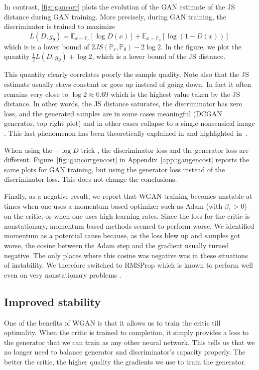 \documentclass{article} %
\newcommand\EE{\mathbb{E}}
\newcommand\PP{\mathbb{P}}
\theoremstyle{definition}
\theoremstyle{definition}
\begin{document}
In contrast, \autoref{fig::gancorr} plots the evolution of the GAN estimate
of the JS distance during GAN training. More precisely, during GAN training,
the discriminator is trained to maximize
 $$L(D, g_\theta) = \EE_{x \sim \PP_r}[\log D(x)] + \EE_{x \sim \PP_\theta}[\log(1 - D(x))]$$
which is is a lower bound of $2 JS(\PP_r,\PP_\theta) - 2 \log 2$.
In the figure, we plot the quantity $\frac{1}{2} L(D, g_\theta) + \log 2$,
which is a lower bound of the JS distance.

This quantity clearly correlates poorly the sample quality. Note
also that the JS estimate usually stays constant or goes up instead
of going down. In fact
it often remains very close to $\log2\approx0.69$ which is the highest
value taken by the JS distance. In other words, the JS distance
saturates, the discriminator has zero loss, and the generated samples
are in some cases meaningful (DCGAN generator, top right plot) and in
other cases collapse to a single nonsensical image \cite{Good-ea-GAN}.
This last phenomenon has been theoretically explained in
\cite{Arj-ea-Princ} and highlighted in~\cite{Metz-ea-UG}.

When using the $-\log D$ trick \cite{Good-ea-GAN},
the discriminator loss and the generator loss are different.
Figure~\ref{fig::gancorrgencost} in Appendix~\ref{app::gangencost}
reports the same plots for GAN training, but using
the generator loss instead of the discriminator loss.
This does not change the conclusions.

Finally, as a negative result, we report that WGAN training becomes unstable
at times when one uses a momentum based optimizer such as Adam \cite{Kingma-ea-Adam} (with $\beta_1 > 0$)
on the critic, or
when one uses high learning rates. Since the loss for the critic is nonstationary, momentum
based methods seemed to perform worse. We identified
momentum as a potential cause because, as the loss blew up and samples got worse,
the cosine between the Adam step and the gradient usually turned negative. The
only places where this cosine was negative was in these situations of
instability. We therefore switched to RMSProp \cite{Tieleman2012} which is known
to perform well even on very nonstationary problems \cite{Mnih-ea-A3C}.

\subsection{Improved stability}

One of the benefits of WGAN is that it allows us to train the critic
till optimality. When the critic is trained to completion, it simply
provides a loss to the generator that we can train as any other neural
network. This tells us that we no longer need to balance generator and
discriminator's capacity properly. The better the critic, the higher
quality the gradients we use to train the generator.
\end{document}
